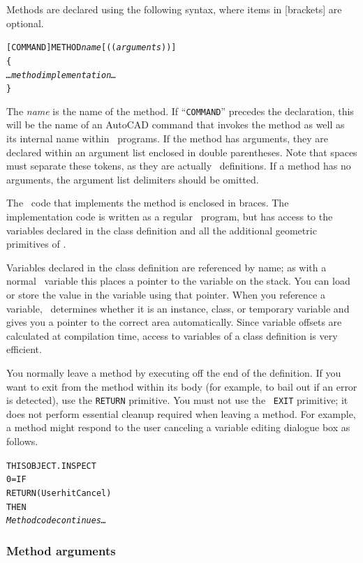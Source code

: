 \documentclass{article}
\begin{document}
Methods are declared using the following syntax, where items in
[brackets] are optional.

\begin{alltt}
[COMMAND] METHOD {\em name} [ (( {\em arguments} )) ]
\{
    {\em \ldots method implementation\ldots }
\}
\end{alltt}

The {\em name} is the name of the method.  If ``{\tt COMMAND}''
precedes the declaration, this will be the name of an AutoCAD command
that invokes the method as well as its internal name within \cw\
programs.  If the method has arguments, they are declared within an
argument list enclosed in double parentheses.  Note that spaces must
separate these tokens, as they are actually \atlas\ definitions.  If
a method has no arguments, the argument list delimiters should be
omitted.

The \atlas\ code that implements the method is enclosed in braces.
The implementation code is written as a regular \atlas\ program, but
has access to the variables declared in the class definition and all
the additional geometric primitives of \cw .

Variables declared in the class definition are referenced by
name; as with a normal \atlas\ variable this places a
pointer to the variable on the stack.  You can load or store the value
in the variable using that pointer.  When you reference a variable,
\cw\ determines whether it is an instance, class, or temporary
variable and gives you a pointer to the correct area automatically.
Since variable offsets are calculated at compilation time, access to
variables of a class definition is very efficient.

You normally leave a method by executing off the end of the
definition.  If you want to exit from the method within its
body (for example, to bail out if an error is detected), use the
{\tt RETURN} primitive.  You must not use the \atlas\ {\tt EXIT}
primitive; it does not perform essential cleanup required when
leaving a method.  For example, a method might respond to the user
canceling a variable editing dialogue box as follows.

\begin{alltt}
        THIS OBJECT.INSPECT
        0= IF
           RETURN   ( User hit Cancel )
        THEN
        {\em Method code continues\ldots}
\end{alltt}

\subsubsection{Method arguments}
\end{document}
